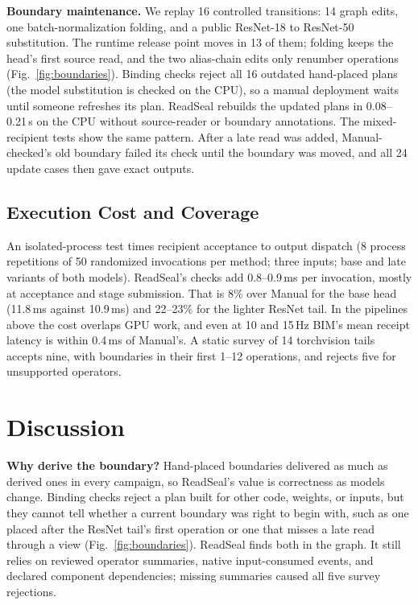 \documentclass[conference]{IEEEtran}
\newcommand{\ms}{\,ms}
\newcommand{\Hz}{\,Hz}
\begin{document}
\textbf{Boundary maintenance.} We replay 16 controlled transitions: 14 graph edits, one batch-normalization folding, and a public ResNet-18 to ResNet-50 substitution. The runtime release point moves in 13 of them; folding keeps the head's first source read, and the two alias-chain edits only renumber operations (Fig.~\ref{fig:boundaries}). Binding checks reject all 16 outdated hand-placed plans (the model substitution is checked on the CPU), so a manual deployment waits until someone refreshes its plan. ReadSeal rebuilds the updated plans in 0.08--0.21\,s on the CPU without source-reader or boundary annotations. The mixed-recipient tests show the same pattern. After a late read was added, Manual-checked's old boundary failed its check until the boundary was moved, and all 24 update cases then gave exact outputs.

\subsection{Execution Cost and Coverage}
\label{sec:eval-cost}

An isolated-process test times recipient acceptance to output dispatch (8 process repetitions of 50 randomized invocations per method; three inputs; base and late variants of both models). ReadSeal's checks add 0.8--0.9\ms{} per invocation, mostly at acceptance and stage submission. That is 8\% over Manual for the base head (11.8\ms{} against 10.9\ms) and 22--23\% for the lighter ResNet tail. In the pipelines above the cost overlaps GPU work, and even at 10 and 15\Hz{} BIM's mean receipt latency is within 0.4\ms{} of Manual's. A static survey of 14 torchvision tails accepts nine, with boundaries in their first 1--12 operations, and rejects five for unsupported operators.

\section{Discussion}
\label{sec:discussion}

\textbf{Why derive the boundary?} Hand-placed boundaries delivered as much as derived ones in every campaign, so ReadSeal's value is correctness as models change. Binding checks reject a plan built for other code, weights, or inputs, but they cannot tell whether a current boundary was right to begin with, such as one placed after the ResNet tail's first operation or one that misses a late read through a view (Fig.~\ref{fig:boundaries}). ReadSeal finds both in the graph. It still relies on reviewed operator summaries, native input-consumed events, and declared component dependencies; missing summaries caused all five survey rejections.
\end{document}
